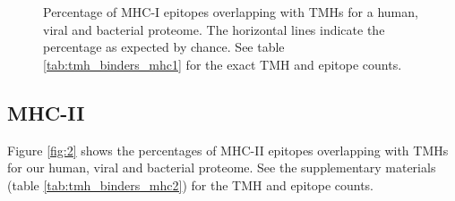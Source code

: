 \begin{figure}[!htbp]
  \caption{
    Percentage of MHC-I epitopes overlapping with TMHs
    for a human, viral and bacterial proteome.
    The horizontal lines indicate the percentage as expected by chance.
    See table \ref{tab:tmh_binders_mhc1} for the exact TMH and epitope counts.
  }
  \label{fig:1}
\end{figure}

\subsection{MHC-II}

Figure \ref{fig:2} shows the percentages of MHC-II epitopes overlapping 
with TMHs for our human, viral and bacterial proteome.
See the supplementary materials (table \ref{tab:tmh_binders_mhc2}) 
for the TMH and epitope counts.

